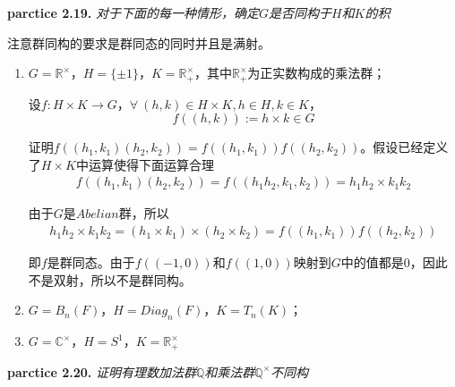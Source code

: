 \begin{mdframed}
    \textbf{parctice 2.19.} \textsl{对于下面的每一种情形，确定$G$是否同构于$H$和$K$的积}

    注意群同构的要求是群同态的同时并且是满射。

    \begin{enumerate}
        \item $G=\mathbb{R}^\times$，$H=\{\pm 1\}$，$K=\mathbb{R}^\times_+$，其中$\mathbb{R}^\times_+$为正实数构成的乘法群；
        
        设$f:H\times K\rightarrow G$，$\forall\ (h,k)\in H\times K,h\in H,k\in K$，
        \begin{equation}
            f((h,k)):=h\times k\in G
        \end{equation}
        
        证明$f((h_1,k_1)(h_2,k_2))=f((h_1,k_1))f((h_2,k_2))$。假设已经定义了$H\times K$中运算使得下面运算合理
        \begin{equation}
            \begin{aligned}
                f((h_1,k_1)(h_2,k_2))=f((h_1h_2,k_1,k_2))=h_1h_2\times k_1k_2
            \end{aligned}
        \end{equation}

        由于$G$是$Abelian$群，所以
        \begin{equation}
            \begin{aligned}
                h_1h_2\times k_1k_2=(h_1\times k_1)\times (h_2\times k_2)=f((h_1,k_1))f((h_2,k_2))
            \end{aligned}
        \end{equation}

        即$f$是群同态。由于$f((-1,0))$和$f((1,0))$映射到$G$中的值都是$0$，因此不是双射，所以不是群同构。
       
        \item $G=B_n(F)$，$H=Diag_n(F)$，$K=T_n(K)$；
        \item $G=\mathbb{C}^\times$，$H=S^1$，$K=\mathbb{R}^\times_+$
    \end{enumerate}
    
\end{mdframed}

\begin{mdframed}
    \textbf{parctice 2.20.} \textsl{证明有理数加法群$\mathbb{Q}$和乘法群$\mathbb{Q}^\times$不同构}
    \hspace*{1em}
    
\end{mdframed}

